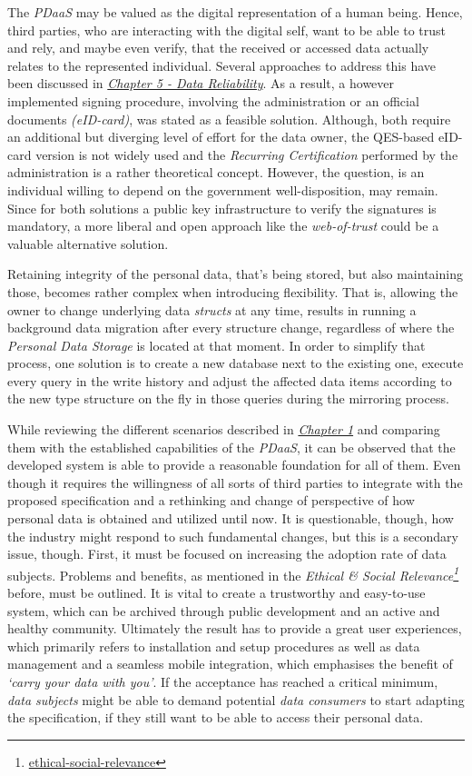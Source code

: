 \documentclass[12pt,english,a4paper,titlepage,cleardoublepage=empty,dottedtoc]{report}
\renewcommand{\href}[2]{#2\footnote{\url{#1}}}
\begin{document}
The \emph{PDaaS} may be valued as the digital representation of a human
being. Hence, third parties, who are interacting with the digital self,
want to be able to trust and rely, and maybe even verify, that the
received or accessed data actually relates to the represented
individual. Several approaches to address this have been discussed in
\emph{\protect\hyperlink{data-reliability}{Chapter 5 - Data
Reliability}}. As a result, a however implemented signing procedure,
involving the administration or an official documents \emph{(eID-card)},
was stated as a feasible solution. Although, both require an additional
but diverging level of effort for the data owner, the QES-based eID-card
version is not widely used and the \emph{Recurring Certification}
performed by the administration is a rather theoretical concept.
However, the question, is an individual willing to depend on the
government well-disposition, may remain. Since for both solutions a
public key infrastructure to verify the signatures is mandatory, a more
liberal and open approach like the \emph{web-of-trust} could be a
valuable alternative solution.

Retaining integrity of the personal data, that's being stored, but also
maintaining those, becomes rather complex when introducing flexibility.
That is, allowing the owner to change underlying data \emph{structs} at
any time, results in running a background data migration after every
structure change, regardless of where the \emph{Personal Data Storage}
is located at that moment. In order to simplify that process, one
solution is to create a new database next to the existing one, execute
every query in the write history and adjust the affected data items
according to the new type structure on the fly in those queries during
the mirroring process.

While reviewing the different scenarios described in
\emph{\protect\hyperlink{scenarios}{Chapter 1}} and comparing them with
the established capabilities of the \emph{PDaaS}, it can be observed
that the developed system is able to provide a reasonable foundation for
all of them. Even though it requires the willingness of all sorts of
third parties to integrate with the proposed specification and a
rethinking and change of perspective of how personal data is obtained
and utilized until now. It is questionable, though, how the industry
might respond to such fundamental changes, but this is a secondary
issue, though. First, it must be focused on increasing the adoption rate
of data subjects. Problems and benefits, as mentioned in the
\emph{\href{ethical-social-relevance}{Ethical \& Social Relevance}}
before, must be outlined. It is vital to create a trustworthy and
easy-to-use system, which can be archived through public development and
an active and healthy community. Ultimately the result has to provide a
great user experiences, which primarily refers to installation and setup
procedures as well as data management and a seamless mobile integration,
which emphasises the benefit of \emph{`carry your data with you'}. If
the acceptance has reached a critical minimum, \emph{data subjects}
might be able to demand potential \emph{data consumers} to start
adapting the specification, if they still want to be able to access
their personal data.
\end{document}
